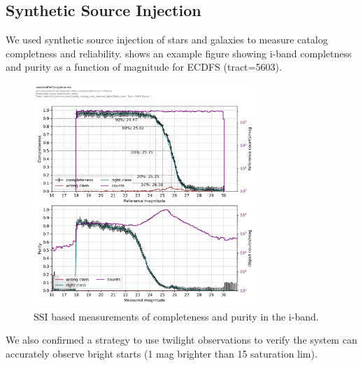 \subsection{Synthetic Source Injection}

We used synthetic source injection of stars and galaxies to measure catalog completness and reliability. 
 shows an example figure showing i-band completness and purity as a function of magnitude for ECDFS (tract=5603).
\begin{figure}
  \centering
    \includegraphics[width=0.75\textwidth]{sample_production_figures/matched_ref_completness_ssi_i.png}
    \caption{SSI based measurements of completeness and purity in the i-band.}
    \label{fig:ssi_comp}
\end{figure}

We also confirmed a strategy to use twilight observations to verify the system can accurately observe bright starts (1 mag brighter than 15 saturation lim). 

  
  